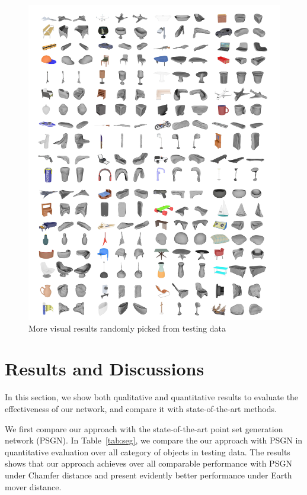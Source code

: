 \begin{figure}[htbp]
	\centering
	\includegraphics[width=\linewidth]{img/more_res/res}
	\caption{More visual results randomly picked from testing data}
	\label{fig:more_res}
\end{figure}



\section{Results and Discussions}

In this section, we show both qualitative and quantitative results to evaluate the effectiveness of our network, and compare it with state-of-the-art methods.

We first compare our approach with the state-of-the-art point set generation network (PSGN)\cite{PSGN}. 
In Table~\ref{tab:seg}, we compare the our approach with PSGN\cite{PSGN} in quantitative evaluation over all category of objects in testing data. 
The results shows that our approach achieves over all comparable performance with PSGN\cite{PSGN} under Chamfer distance and present evidently better performance under Earth mover distance. 


